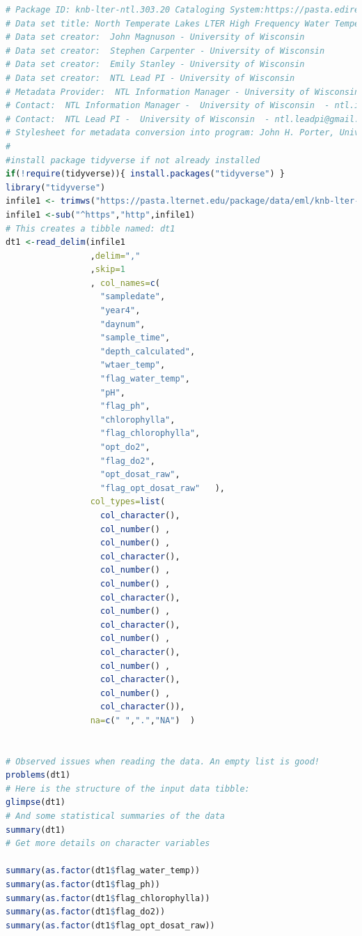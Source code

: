 \documentclass[
]{book}
\begin{document}
\begin{lstlisting}[language=R]
# Package ID: knb-lter-ntl.303.20 Cataloging System:https://pasta.edirepository.org.
# Data set title: North Temperate Lakes LTER High Frequency Water Temperature Data, Dissolved Oxygen, Chlorophyll, pH - Crystal Lake 2011 - 2014.
# Data set creator:  John Magnuson - University of Wisconsin 
# Data set creator:  Stephen Carpenter - University of Wisconsin 
# Data set creator:  Emily Stanley - University of Wisconsin 
# Data set creator:  NTL Lead PI - University of Wisconsin 
# Metadata Provider:  NTL Information Manager - University of Wisconsin 
# Contact:  NTL Information Manager -  University of Wisconsin  - ntl.infomgr@gmail.com
# Contact:  NTL Lead PI -  University of Wisconsin  - ntl.leadpi@gmail.com
# Stylesheet for metadata conversion into program: John H. Porter, Univ. Virginia, jporter@Virginia.edu 
#
#install package tidyverse if not already installed
if(!require(tidyverse)){ install.packages("tidyverse") }  
library("tidyverse") 
infile1 <- trimws("https://pasta.lternet.edu/package/data/eml/knb-lter-ntl/303/20/b9b3b932deec8f3e71fb8d70cacf6a0e") 
infile1 <-sub("^https","http",infile1)
# This creates a tibble named: dt1 
dt1 <-read_delim(infile1  
                 ,delim=","   
                 ,skip=1 
                 , col_names=c( 
                   "sampledate",   
                   "year4",   
                   "daynum",   
                   "sample_time",   
                   "depth_calculated",   
                   "wtaer_temp",   
                   "flag_water_temp",   
                   "pH",   
                   "flag_ph",   
                   "chlorophylla",   
                   "flag_chlorophylla",   
                   "opt_do2",   
                   "flag_do2",   
                   "opt_dosat_raw",   
                   "flag_opt_dosat_raw"   ), 
                 col_types=list(
                   col_character(), 
                   col_number() , 
                   col_number() , 
                   col_character(), 
                   col_number() , 
                   col_number() ,  
                   col_character(), 
                   col_number() ,  
                   col_character(), 
                   col_number() ,  
                   col_character(), 
                   col_number() ,  
                   col_character(), 
                   col_number() ,  
                   col_character()), 
                 na=c(" ",".","NA")  )


# Observed issues when reading the data. An empty list is good!
problems(dt1) 
# Here is the structure of the input data tibble: 
glimpse(dt1) 
# And some statistical summaries of the data 
summary(dt1) 
# Get more details on character variables

summary(as.factor(dt1$flag_water_temp)) 
summary(as.factor(dt1$flag_ph)) 
summary(as.factor(dt1$flag_chlorophylla)) 
summary(as.factor(dt1$flag_do2)) 
summary(as.factor(dt1$flag_opt_dosat_raw))
\end{lstlisting}
\end{document}
